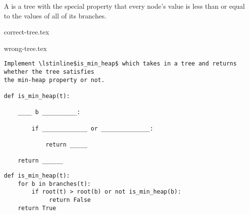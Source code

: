 \begin{blocksection}
\question A  is a tree with the special property that every node's value is
less than or equal to the values of all of its branches.

\vspace{\parskip}
\begin{minipage}{0.5\linewidth}
\centering
{correct-tree.tex}
\end{minipage}
\begin{minipage}{0.5\linewidth}
\centering
{wrong-tree.tex}
\end{minipage}
\vspace{\parskip}
\begin{lstlisting}
Implement \lstinline$is_min_heap$ which takes in a tree and returns whether the tree satisfies
the min-heap property or not.

def is_min_heap(t):

    ____ b __________:

        if _____________ or ______________:

            return _____

    return ______
\end{lstlisting}
\begin{solution}[1.5in]
\begin{lstlisting}
def is_min_heap(t):
    for b in branches(t):
        if root(t) > root(b) or not is_min_heap(b):
             return False
    return True
\end{lstlisting}
\end{solution}
\end{blocksection}
